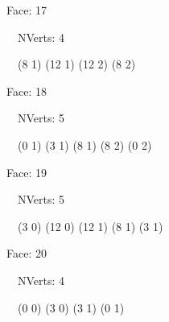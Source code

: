 \documentclass{article}
\begin{document}
{\footnotesize 

Face: 17

\   \    NVerts: 4

 \   \   (8 1) (12 1) (12 2) (8 2)}

{\footnotesize 

Face: 18

\   \    NVerts: 5

 \   \   (0 1) (3 1) (8 1) (8 2) (0 2)}

{\footnotesize 

Face: 19

\   \    NVerts: 5

 \   \   (3 0) (12 0) (12 1) (8 1) (3 1)}

{\footnotesize 

Face: 20

\   \    NVerts: 4

 \   \   (0 0) (3 0) (3 1) (0 1)}


 \newpage
\end{document}
